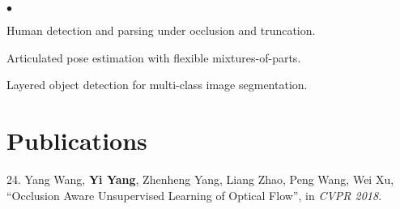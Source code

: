 \documentclass[margin]{res3}
\newenvironment{list1}{
  \begin{list}{\ding{113}}{%
      \setlength{\itemsep}{0.03in}
      \setlength{\parsep}{0in} \setlength{\parskip}{0in}
      \setlength{\topsep}{0in} \setlength{\partopsep}{0in}
      \setlength{\leftmargin}{0in}}}{\end{list}}
\newenvironment{list2}{
  \begin{list}{$\bullet$}{%
      \setlength{\itemsep}{0.02in}
      \setlength{\parsep}{0in} \setlength{\parskip}{0in}
      \setlength{\topsep}{0in} \setlength{\partopsep}{0in}
      \setlength{\leftmargin}{0.2in}}}{\end{list}}
\begin{document}
\begin{resume}
\begin{list1}
\begin{list2}
\item Human detection and parsing under occlusion and truncation.
\vspace{-2pt}
\item Articulated pose estimation with flexible mixtures-of-parts.
\vspace{-2pt}
\item Layered object detection for multi-class image segmentation.
\end{list2}
\vspace{5pt}


 

\end{list1}

\section{\sc Publications}
\begin{list1}

\item[] 24. Yang Wang, {\bf Yi Yang}, Zhenheng Yang, Liang Zhao, Peng Wang, Wei Xu,
``Occlusion Aware Unsupervised Learning of Optical Flow'',
in \textit{CVPR 2018}.


\end{list1}
\end{resume}
\end{document}
